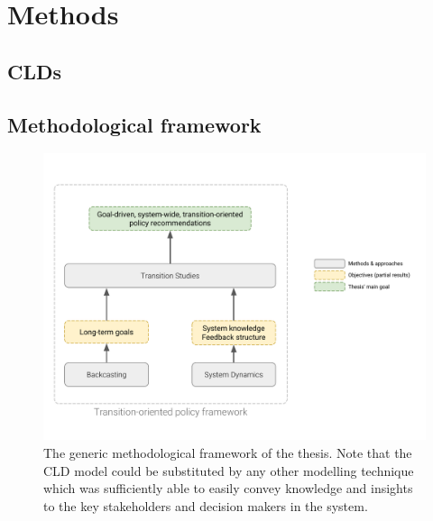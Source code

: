 \chapter{Methods}
\label{c:methods}

\section{CLDs}


\section{Methodological framework}
\label{s:methods:framework}


\begin{figure}[h]
\centering
\includegraphics[trim=1cm 2cm 1.5cm 3cm,clip,width=\linewidth]{figures/methods-goals.pdf}
\caption[Thesis' methodological framework]{The generic methodological framework of the thesis. Note that the CLD model could be substituted by any other modelling technique which was sufficiently able to easily convey knowledge and insights to the key stakeholders and decision makers in the system.}
\label{fig:thesis-aim-methods}
\end{figure}

